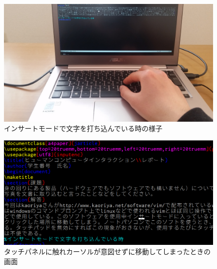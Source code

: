 \documentclass[a4paper]{jarticle}
\begin{document}
\begin{figure}[H]
	\begin{center}
		\includegraphics[width=15cm]{picture1.jpg}
		\caption{インサートモードで文字を打ち込んでいる時の様子}
		\label{picture1}
	\end{center}
\end{figure}

\begin{figure}[H]
	\begin{center}
		\includegraphics[width=15cm]{screenshot2edited.png}
		\caption{タッチパネルに触れカーソルが意図せずに移動してしまったときの画面}
		\label{screenshot2edited}
	\end{center}
\end{figure}
\end{document}
